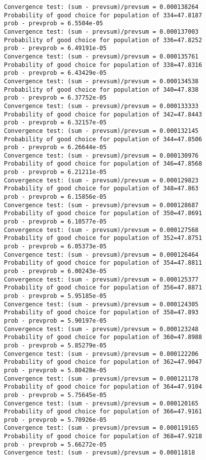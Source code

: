 \documentclass[11pt,onecolumn]{article}
\begin{document}
\begin{verbatim}
Convergence test: (sum - prevsum)/prevsum = 0.000138264
Probability of good choice for population of 334=47.8187
prob - prevprob = 6.5504e-05
Convergence test: (sum - prevsum)/prevsum = 0.000137003
Probability of good choice for population of 336=47.8252
prob - prevprob = 6.49191e-05
Convergence test: (sum - prevsum)/prevsum = 0.000135761
Probability of good choice for population of 338=47.8316
prob - prevprob = 6.43429e-05
Convergence test: (sum - prevsum)/prevsum = 0.000134538
Probability of good choice for population of 340=47.838
prob - prevprob = 6.37752e-05
Convergence test: (sum - prevsum)/prevsum = 0.000133333
Probability of good choice for population of 342=47.8443
prob - prevprob = 6.32157e-05
Convergence test: (sum - prevsum)/prevsum = 0.000132145
Probability of good choice for population of 344=47.8506
prob - prevprob = 6.26644e-05
Convergence test: (sum - prevsum)/prevsum = 0.000130976
Probability of good choice for population of 346=47.8568
prob - prevprob = 6.21211e-05
Convergence test: (sum - prevsum)/prevsum = 0.000129823
Probability of good choice for population of 348=47.863
prob - prevprob = 6.15856e-05
Convergence test: (sum - prevsum)/prevsum = 0.000128687
Probability of good choice for population of 350=47.8691
prob - prevprob = 6.10577e-05
Convergence test: (sum - prevsum)/prevsum = 0.000127568
Probability of good choice for population of 352=47.8751
prob - prevprob = 6.05373e-05
Convergence test: (sum - prevsum)/prevsum = 0.000126464
Probability of good choice for population of 354=47.8811
prob - prevprob = 6.00243e-05
Convergence test: (sum - prevsum)/prevsum = 0.000125377
Probability of good choice for population of 356=47.8871
prob - prevprob = 5.95185e-05
Convergence test: (sum - prevsum)/prevsum = 0.000124305
Probability of good choice for population of 358=47.893
prob - prevprob = 5.90197e-05
Convergence test: (sum - prevsum)/prevsum = 0.000123248
Probability of good choice for population of 360=47.8988
prob - prevprob = 5.85279e-05
Convergence test: (sum - prevsum)/prevsum = 0.000122206
Probability of good choice for population of 362=47.9047
prob - prevprob = 5.80428e-05
Convergence test: (sum - prevsum)/prevsum = 0.000121178
Probability of good choice for population of 364=47.9104
prob - prevprob = 5.75645e-05
Convergence test: (sum - prevsum)/prevsum = 0.000120165
Probability of good choice for population of 366=47.9161
prob - prevprob = 5.70926e-05
Convergence test: (sum - prevsum)/prevsum = 0.000119165
Probability of good choice for population of 368=47.9218
prob - prevprob = 5.66272e-05
Convergence test: (sum - prevsum)/prevsum = 0.00011818

\end{verbatim}
\end{document}
